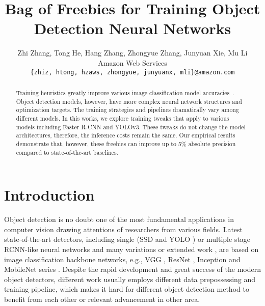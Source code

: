 \documentclass[10pt,twocolumn,letterpaper]{article}
\begin{document}
\title{Bag of Freebies for Training Object Detection Neural Networks}

\author{Zhi Zhang, Tong He, Hang Zhang, Zhongyue Zhang, Junyuan Xie, Mu Li\\
Amazon Web Services\\
{\tt\small \{zhiz, htong, hzaws, zhongyue, junyuanx, mli\}@amazon.com}
}

\maketitle



\begin{abstract}
Training heuristics greatly improve various image classification model accuracies~\cite{he2018bag}. Object detection models, however, have more complex neural network structures and optimization targets. The training strategies and pipelines dramatically vary among different models. In this works, we explore training tweaks that apply to various models including Faster R-CNN and YOLOv3. These tweaks do not change the model architectures, therefore, the inference costs remain the same. Our empirical results demonstrate that, however, these freebies can improve up to 5\% absolute precision compared to state-of-the-art baselines. 
\end{abstract}

\section{Introduction}

Object detection is no doubt one of the most fundamental applications in computer vision drawing attentions of researchers from various fields. Latest state-of-the-art detectors, including single (SSD \cite{liu2016ssd} and YOLO \cite{redmon2018yolov3}) or multiple stage RCNN-like \cite{girshick2015fast} neural networks and many variations or extended work  \cite{ren2015faster,Shen_2017}, are based on image classification backbone networks, e.g., VGG \cite{simonyan2014very}, ResNet \cite{he2016deep}, Inception \cite{szegedy2016rethinking} and MobileNet series \cite{howard2017mobilenets, sandler2018mobilenetv2}. 
Despite the rapid development and great success of the modern object detectors, different work usually employs different data prepossessing and training pipeline, which makes it hard for different object detection method to benefit from each other or relevant advancement in other area.  
\end{document}

